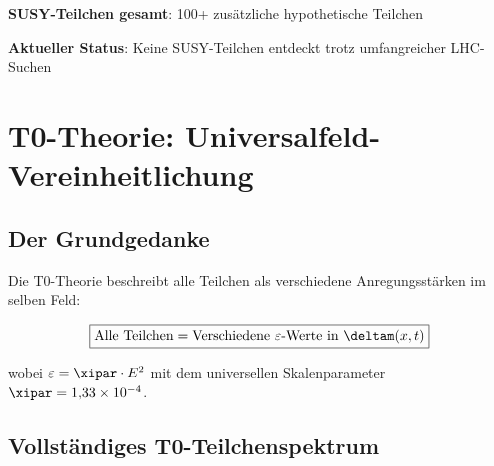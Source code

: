 	\textbf{SUSY-Teilchen gesamt}: 100+ zusätzliche hypothetische Teilchen
	
	\textbf{Aktueller Status}: Keine SUSY-Teilchen entdeckt trotz umfangreicher LHC-Suchen
	
	\section{T0-Theorie: Universalfeld-Vereinheitlichung}
	
	\subsection{Der Grundgedanke}
	
	Die T0-Theorie beschreibt alle Teilchen als verschiedene Anregungsstärken im selben Feld:
	
	\begin{equation}
		\boxed{\text{Alle Teilchen} = \text{Verschiedene } \varepsilon \text{-Werte in } \deltam(x,t)}
		\label{eq:universal_particle_principle}
	\end{equation}
	
	wobei $\varepsilon = \xipar \cdot E^2$ mit dem universellen Skalenparameter $\xipar = 1{,}33 \times 10^{-4}$.
	
	\subsection{Vollständiges T0-Teilchenspektrum}
	
